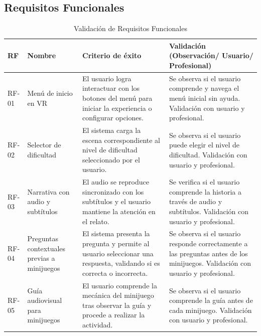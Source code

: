 \subsection{Requisitos Funcionales}
\begin{table}[H]
\centering
\small
\caption{Validación de Requisitos Funcionales}
\begin{tabular}{|l|p{3cm}|p{5.2cm}|p{5.2cm}|}
\hline
\textbf{RF} & \textbf{Nombre} & \textbf{Criterio de éxito} & \textbf{Validación (Observación/ Usuario/ Profesional)} \\
\hline
RF-01 & Menú de inicio en VR & El usuario logra interactuar con los botones del menú para iniciar la experiencia o configurar opciones. & Se observa si el usuario comprende y navega el menú inicial sin ayuda. Validación con usuario y profesional. \\
\hline
RF-02 & Selector de dificultad & El sistema carga la escena correspondiente al nivel de dificultad seleccionado por el usuario. & Se observa si el usuario puede elegir el nivel de dificultad. Validación con usuario y profesional. \\
\hline
RF-03 & Narrativa con audio y subtítulos & El audio se reproduce sincronizado con los subtítulos y el usuario mantiene la atención en el relato. & Se verifica si el usuario comprende la historia a través de audio y subtítulos. Validación con usuario y profesional. \\
\hline
RF-04 & Preguntas contextuales previas a minijuegos & El sistema presenta la pregunta y permite al usuario seleccionar una respuesta, validando si es correcta o incorrecta. & Se observa si el usuario responde correctamente a las preguntas antes de los minijuegos. Validación con usuario y profesional. \\
\hline
RF-05 & Guía audiovisual para minijuegos & El usuario comprende la mecánica del minijuego tras observar la guía y procede a realizar la actividad. & Se observa si el usuario comprende la guía antes de cada minijuego. Validación con usuario y profesional. \\
\hline
\end{tabular}
\end{table}

